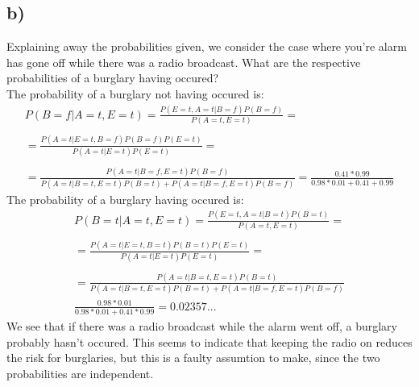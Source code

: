 \documentclass[11pt,a4paper]{article}
\begin{document}
\subsection*{b)}
Explaining away the probabilities given, we consider the case where you're alarm has gone off while there was a radio broadcast. What are the respective probabilities of a burglary having occured?\\
The probability of a burglary not having occured is:
\begin{equation*}
  \begin{split}
  P(B=f|A=t,E=t)  = \frac{P(E=t, A=t | B=f)P(B=f)}{P(A=t,E=t)}=\\
  \\
  =  \frac{P(A=t |E=t, B=f)P(B=f)P(E=t)}{P(A=t|E=t)P(E=t)}= \\
  \\
  =  \frac{P(A=t| B=f, E=t)P(B=f)}{P(A=t|B=t,E=t)P(B=t)+P(A=t|B=f,E=t)P(B=f)} = \frac{0.41*0.99}{0.98*0.01+0.41+0.99}
  \end{split}
\end{equation*}
The probability of a burglary having occured is:
\begin{equation*}
  \begin{split}
  P(B=t|A=t,E=t)  = \frac{P(E=t, A=t | B=t)P(B=t)}{P(A=t,E=t)}= \\
  \\
  =  \frac{P(A=t |E=t, B=t)P(B=t)P(E=t)}{P(A=t|E=t)P(E=t)}= \\
  \\
  =  \frac{P(A=t| B=t, E=t)P(B=t)}{P(A=t|B=t,E=t)P(B=t)+P(A=t|B=f,E=t)P(B=f)} \\
  \frac{0.98*0.01}{0.98*0.01+0.41*0.99}=0.02357...
  \end{split}
\end{equation*}
We see that if there was a radio broadcast while the alarm went off, a burglary probably hasn't occured. This seems to indicate that keeping the radio on reduces the risk for burglaries, but this is a faulty assumtion to make, since the two probabilities are independent.
\end{document}

